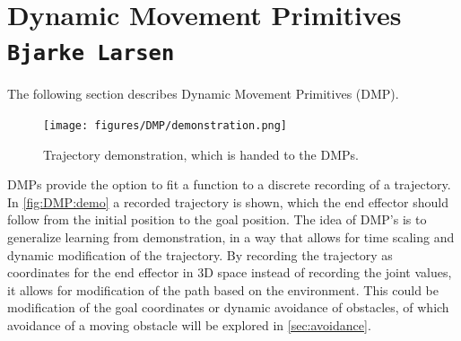 \documentclass[../main.tex]{subfiles}
\begin{document}
\section{Dynamic Movement Primitives  \\ \normalfont\normalsize\texttt{Bjarke Larsen}}
\label{sec:DMP}
The following section describes Dynamic Movement Primitives (DMP).

\begin{figure}[H]
    \centering
         \texttt{[image: figures/DMP/demonstration.png]}
     \caption{Trajectory demonstration, which is handed to the DMPs.}
     \label{fig:DMP:demo}
\end{figure}
DMPs provide the option to fit a function to a discrete recording of a trajectory. In \autoref{fig:DMP:demo} a recorded trajectory is shown, which the end effector should follow from the initial position to the goal position. The idea of DMP's is to generalize learning from demonstration, in a way that allows for time scaling and dynamic modification of the trajectory.
By recording the trajectory as coordinates for the end effector in 3D space instead of recording the joint values, it allows for modification of the path based on the environment. This could be modification of the goal coordinates or dynamic avoidance of obstacles, of which avoidance of a moving obstacle will be explored in \autoref{sec:avoidance}.

\end{document}
